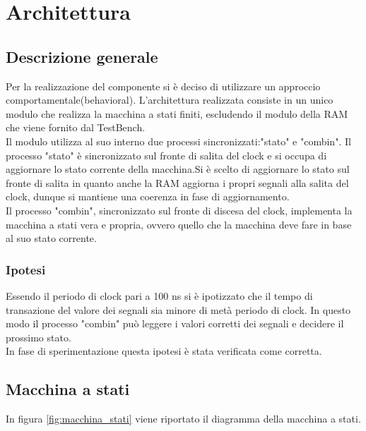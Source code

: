 \section{Architettura}
\subsection{Descrizione generale}
Per la realizzazione del componente si è deciso di utilizzare un approccio comportamentale(behavioral).
L'architettura realizzata consiste in un unico modulo che realizza la macchina a stati finiti, escludendo il modulo della RAM che viene fornito dal TestBench.\\
Il modulo utilizza al suo interno due processi sincronizzati:"stato" e "combin".
Il processo "stato" è sincronizzato sul fronte di salita del clock e si occupa di aggiornare lo stato corrente della macchina.Si è scelto di aggiornare lo stato sul fronte di salita in quanto anche la RAM aggiorna i propri segnali alla salita del clock, dunque si mantiene una coerenza in fase di aggiornamento. \\
Il processo "combin", sincronizzato sul fronte di discesa del clock, implementa la macchina a stati vera e propria, ovvero quello che la macchina deve fare in base al suo stato corrente.

\subsubsection{Ipotesi}
Essendo il periodo di clock pari a 100 ns si è ipotizzato che il tempo di transazione del valore dei segnali sia minore di metà periodo di clock. In questo modo il processo "combin" può leggere i valori corretti dei segnali e decidere il prossimo stato.\\
In fase di sperimentazione questa ipotesi è stata verificata come corretta.

\subsection{Macchina a stati}
In figura \ref{fig:macchina_stati} viene riportato il diagramma della macchina a stati.\\

